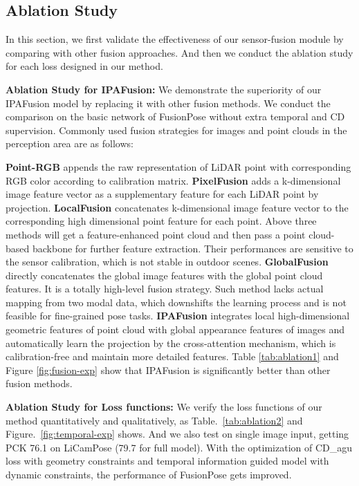 \documentclass[letterpaper]{article} %
\begin{document}
\subsection{Ablation Study}
In this section, we first validate the effectiveness of our sensor-fusion module by comparing with other fusion approaches. And then we conduct the ablation study for each loss designed in our method.

\noindent \textbf{Ablation Study for IPAFusion:} We demonstrate the superiority of our IPAFusion model by replacing it with other fusion methods. We conduct the comparison on the basic network of FusionPose without extra temporal and CD supervision. Commonly used fusion strategies for images and point clouds in the perception area are as follows:

\noindent\textbf{Point-RGB} appends the raw representation of LiDAR point with corresponding RGB color according to calibration matrix. 
\noindent\textbf{PixelFusion} adds a k-dimensional image feature vector as a supplementary feature for each LiDAR point by projection.
\noindent\textbf{LocalFusion} concatenates k-dimensional image feature vector to the corresponding high dimensional point feature for each point. Above three methods will get a feature-enhanced point cloud and then pass a point cloud-based backbone for further feature extraction. Their performances are sensitive to the sensor calibration, which is not stable in outdoor scenes.
\noindent\textbf{GlobalFusion} directly concatenates the global image features with the global point cloud features. It is a totally high-level fusion strategy. Such method lacks actual mapping from two modal data, which downshifts the learning process and is not feasible for fine-grained pose tasks.
\noindent\textbf{IPAFusion} integrates local high-dimensional geometric features of point cloud with global appearance features of images and automatically learn the projection by the cross-attention mechanism, which is calibration-free and maintain more detailed features. Table \ref{tab:ablation1} and Figure \ref{fig:fusion-exp} show that IPAFusion is significantly better than other fusion methods. 


\noindent \textbf{Ablation Study for Loss functions:}
We verify the loss functions of our method quantitatively and qualitatively, as Table.~\ref{tab:ablation2} and Figure.~\ref{fig:temporal-exp} shows. And we also test on single image input, getting PCK 76.1 on LiCamPose (79.7 for full model). With the optimization of CD\_agu loss with geometry constraints and temporal information guided model with dynamic constraints, the performance of FusionPose gets improved.
\end{document}

